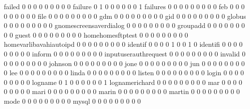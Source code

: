 \documentclass[compress,8pt]{beamer}
\begin{document}
\begin{frame}
\begin{Schunk}
  failed                                     0   0   0   0   0   0   0   0   0
  failure                                    0   1   0   0   0   0   0   0   1
  failures                                   0   0   0   0   0   0   0   0   0
  feb                                        0   0   0   0   0   0   0   0   0
  file                                       0   0   0   0   0   0   0   0   0
  gdm                                        0   0   0   0   0   0   0   0   0
  gid                                        0   0   0   0   0   0   0   0   0
  globus                                     0   0   0   0   0   0   0   0   0
  gnomescreensaverdialog                     0   0   0   0   0   0   0   0   0
  groupadd                                   0   0   0   0   0   0   0   0   0
  guest                                      0   0   0   0   0   0   0   0   0
  homehomesftptest                           0   0   0   0   0   0   0   0   0
  homevarlibavahiautoipd                     0   0   0   0   0   0   0   0   0
  identif                                    0   0   0   0   1   0   0   1   0
  identifi                                   0   0   0   0   0   0   0   0   0
  inform                                     0   0   0   0   0   0   0   0   0
  inputuserauthrequest                       0   0   0   0   0   0   0   0   0
  invalid                                    0   0   0   0   0   0   0   0   0
  johnson                                    0   0   0   0   0   0   0   0   0
  jone                                       0   0   0   0   0   0   0   0   0
  jun                                        0   0   0   0   0   0   0   0   0
  lee                                        0   0   0   0   0   0   0   0   0
  linda                                      0   0   0   0   0   0   0   0   0
  listen                                     0   0   0   0   0   0   0   0   0
  login                                      0   0   0   0   0   0   0   0   0
  logname                                    0   1   0   0   0   0   0   0   1
  lognamerichard                             0   0   0   0   0   0   0   0   0
  mar                                        0   0   0   0   0   0   0   0   0
  mari                                       0   0   0   0   0   0   0   0   0
  marin                                      0   0   0   0   0   0   0   0   0
  martin                                     0   0   0   0   0   0   0   0   0
  mode                                       0   0   0   0   0   0   0   0   0
  mysql                                      0   0   0   0   0   0   0   0   0

\end{Schunk}
\end{frame}
\end{document}

